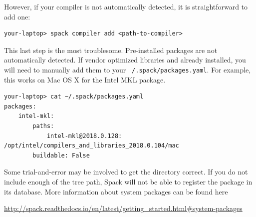However, if your compiler is not automatically detected, it is straightforward
to add one:
\verbatimfont{\footnotesize}
\begin{verbatim}
your-laptop> spack compiler add <path-to-compiler>
\end{verbatim}

This last step is the most troublesome. Pre-installed packages are not
automatically detected. If vendor optimized libraries and already installed,
you will need to manually add them to your
\texttt{~/.spack/packages.yaml}. For example, this works on Mac OS X for the Intel MKL package.
\verbatimfont{\footnotesize}
\begin{verbatim}
your-laptop> cat ~/.spack/packages.yaml
packages:
    intel-mkl:
        paths:
            intel-mkl@2018.0.128: /opt/intel/compilers_and_libraries_2018.0.104/mac
        buildable: False
\end{verbatim}

Some trial-and-error may be involved to get the directory correct. If
you do not include enough of the tree path, Spack will not be able to
register the package in its database. More information about system
packages can be found here

\url{http://spack.readthedocs.io/en/latest/getting_started.html#system-packages}

